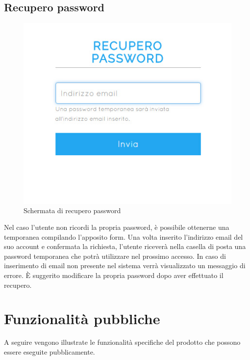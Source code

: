 \documentclass[a4paper, titlepage]{article}
\begin{document}
	\subsection{Recupero password}
	\begin{figure}[!h]
		\centering
		\includegraphics[scale=0.5]{Img/screen_RecuperoPwd.png}
		\caption{Schermata di recupero password}
	\end{figure}
	Nel caso l'utente non ricordi la propria password, è possibile ottenerne una temporanea compilando l'apposito form. Una volta inserito l'indirizzo email del suo account e confermata la richiesta, l'utente riceverà nella casella di posta una password temporanea che potrà utilizzare nel prossimo accesso. In caso di inserimento di email non presente nel sistema verrà visualizzato un messaggio di errore. È suggerito modificare la propria password dopo aver effettuato il recupero.
	
	
	\newpage
	\section{Funzionalità pubbliche}
	\label{pub}
		A seguire vengono illustrate le funzionalità specifiche del prodotto che possono essere eseguite pubblicamente.
		
\end{document}
